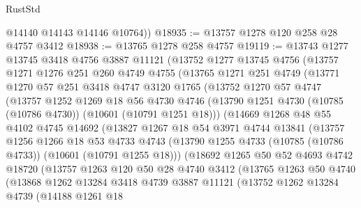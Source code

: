 \begin{lexlean}{RustStd}
\begin{coremodule}
        @14140
        @14143
        @14146
        @10764))
@18935 := @13757 @1278 @120 @258 @28 @4757 @3412
@18938 := @13765 @1278 @258 @4757
@19119 := @13743
    @1277
    @13745
    @3418
    @4756
    @3887
    @11121
    (@13752
      @1277
      @13745
      @4756
      (@13757
        @1271
        @1276
        @251
        @260
        @4749
        @4755
        (@13765
          @1271
          @251
          @4749
          (@13771
            @1270
            @57
            @251
            @3418
            @4747
            @3120
            @1765
            (@13752
              @1270
              @57
              @4747
              (@13757
                @1252
                @1269
                @18
                @56
                @4730
                @4746
                (@13790 @1251 @4730 (@10785 (@10786 @4730)) (@10601 (@10791 @1251 @18)))
                (@14669
                  @1268
                  @48
                  @55
                  @4102
                  @4745
                  @14692
                  (@13827
                    @1267
                    @18
                    @54
                    @3971
                    @4744
                    @13841
                    (@13757
                      @1256
                      @1266
                      @18
                      @53
                      @4733
                      @4743
                      (@13790 @1255 @4733 (@10785 (@10786 @4733)) (@10601 (@10791 @1255 @18)))
                      (@18692
                        @1265
                        @50
                        @52
                        @4693
                        @4742
                        @18720
                        (@13757
                          @1263
                          @120
                          @50
                          @28
                          @4740
                          @3412
                          (@13765
                            @1263
                            @50
                            @4740
                            (@13868
                              @1262
                              @13284
                              @3418
                              @4739
                              @3887
                              @11121
                              (@13752
                                @1262
                                @13284
                                @4739
                                (@14188
                                  @1261
                                  @18

\end{coremodule}
\end{lexlean}
